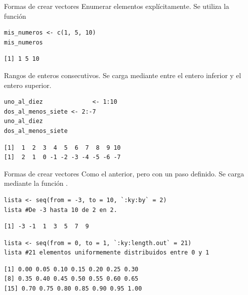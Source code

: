 \documentclass[8pt]{beamer}
\begin{document}
\begin{frame}[fragile]{Formas de crear vectores}
	Enumerar elementos explícitamente. Se utiliza la función 
\begin{lstlisting}[style=RScript]
mis_numeros <- c(1, 5, 10)
mis_numeros
\end{lstlisting}
\begin{lstlisting}[style=RConsole]
[1] 1 5 10
\end{lstlisting}

Rangos de enteros consecutivos. Se carga mediante \rscript{:} entre el entero inferior y el entero superior.
\begin{lstlisting}[style=RScript]
uno_al_diez				 <- 1:10
dos_al_menos_siete <- 2:-7
uno_al_diez
dos_al_menos_siete
\end{lstlisting}
\begin{lstlisting}[style=RConsole]
[1]  1  2  3  4  5  6  7  8  9 10
[1]  2  1  0 -1 -2 -3 -4 -5 -6 -7
\end{lstlisting}
\end{frame}


\begin{frame}[fragile]{Formas de crear vectores}
	Como el anterior, pero con un paso definido. Se carga mediante la función .
\begin{lstlisting}[style=RScript]
lista <- seq(from = -3, to = 10, `:ky:by` = 2)
lista #De -3 hasta 10 de 2 en 2.
\end{lstlisting}
\begin{lstlisting}[style=RConsole]
[1] -3 -1  1  3  5  7  9
\end{lstlisting}
\begin{lstlisting}[style=RScript]
lista <- seq(from = 0, to = 1, `:ky:length.out` = 21)
lista #21 elementos uniformemente distribuidos entre 0 y 1
\end{lstlisting}
\begin{lstlisting}[style=RConsole]
[1] 0.00 0.05 0.10 0.15 0.20 0.25 0.30
[8] 0.35 0.40 0.45 0.50 0.55 0.60 0.65
[15] 0.70 0.75 0.80 0.85 0.90 0.95 1.00
\end{lstlisting}
\end{frame}
\end{document}
